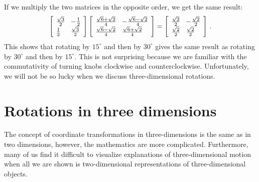 \documentclass[11pt,a4paper]{report}
\newcommand*{\spacearray}{
\renewcommand{\arraystretch}{1.2}
\setlength{\arraycolsep}{4pt}
}
\begin{document}
If we multiply the two matrices in the opposite order, we get the same result:
\begin{displaymath}
\spacearray
\left[
\begin{array}{l} \frac{\sqrt{3}}{2} \\ \frac{1}{2} \end{array}\\
\begin{array}{l} -\frac{1}{2} \\ \frac{\sqrt{3}}{2} \end{array}\\
\right]
\left[
\begin{array}{l} \frac{\sqrt{6}+\sqrt{2}}{4} \\ \frac{\sqrt{6}-\sqrt{2}}{4} \end{array}\\
\begin{array}{l} -\frac{\sqrt{6}-\sqrt{2}}{4} \\ \frac{\sqrt{6}+\sqrt{2}}{4} \end{array}\\
\right]
=
\left[
\begin{array}{l} \frac{\sqrt{2}}{2} \\ \frac{\sqrt{2}}{2} \end{array}\\
\begin{array}{l} -\frac{\sqrt{2}}{2} \\ \frac{\sqrt{2}}{2} \end{array}\\
\right]\,.
\end{displaymath}
This shows that rotating by $15^\circ$ and then by $30^\circ$ gives the same result as rotating by $30^\circ$ and then by $15^\circ$. This is not surprising because we are familiar with the commutativity of turning knobs clockwise and counterclockwise. Unfortunately, we will not be so lucky when we discuss three-dimensional rotations.


\chapter{Rotations in three dimensions}

The concept of coordinate transformations in three-dimensions is the same as in two dimensions, however, the mathematics are more complicated. Furthermore, many of us find it difficult to visualize explanations of three-dimensional motion when all we are shown is two-dimensional representations of three-dimensional objects.
\end{document}
